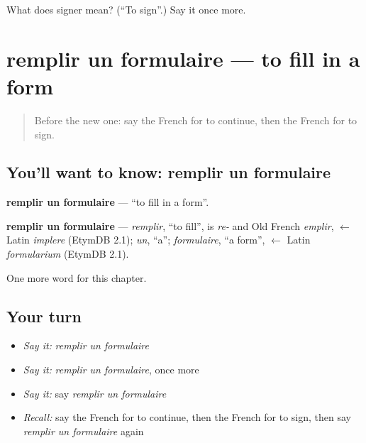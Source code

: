 \begin{tcolorbox}[breakable,colback=teal!4,colframe=teal!35!black,title={Before you move on}]
What does signer mean? (\textquotedblleft{}To sign\textquotedblright{}.) Say it once more.
\end{tcolorbox}
\section[remplir un formulaire]{remplir un formulaire — to fill in a form}

\label{lesson:FR-C145-remplir-un-formulaire}



\begin{quote}
Before the new one: say the French for to continue, then the French for to sign.
\end{quote}

\subsection*{You'll want to know: remplir un formulaire}
\textbf{remplir un formulaire} — \textquotedblleft{}to fill in a form\textquotedblright{}.

\begin{cousinweb}
\textbf{remplir un formulaire} — \emph{remplir}, \textquotedblleft{}to fill\textquotedblright{}, is \emph{re-} and Old French \emph{emplir}, $\leftarrow$ Latin \emph{implere} (EtymDB 2.1); \emph{un}, \textquotedblleft{}a\textquotedblright{}; \emph{formulaire}, \textquotedblleft{}a form\textquotedblright{}, $\leftarrow$ Latin \emph{formularium} (EtymDB 2.1).
\end{cousinweb}

\begin{grammarlens}[title={What you've built}]
One more word for this chapter.
\end{grammarlens}

\subsection*{Your turn}
\begin{itemize}
\raggedright
  \item \emph{Say it:} \emph{remplir un formulaire}
  \item \emph{Say it:} \emph{remplir un formulaire}, once more
  \item \emph{Say it:} say \emph{remplir un formulaire}
  \item \emph{Recall:} say the French for to continue, then the French for to sign, then say \emph{remplir un formulaire} again
\end{itemize}

